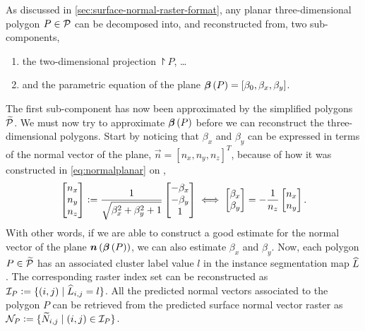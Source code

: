 As discussed in \cref{sec:surface-normal-raster-format}, any planar three-dimensional polygon $P \in \mathcal{P}$ can be decomposed into, and reconstructed from, two sub-components,
\begin{enumerate}[nosep]
  \item the two-dimensional projection $\project{P}$, \dots
  \item and the parametric equation of the plane $\boldsymbol{\beta}\left(P\right) = [\beta_0, \beta_x, \beta_y]$.
\end{enumerate}
The first sub-component has now been approximated by the simplified polygons $\widetilde{\mathcal{P}}$.
We must now try to approximate $\boldsymbol{\beta}\left(P\right)$ before we can reconstruct the three-dimensional polygons.
Start by noticing that $\beta_x$ and $\beta_y$ can be expressed in terms of the normal vector of the plane, $\vec{n} = {[n_x, n_y, n_z]}^T$, because of how it was constructed in \cref{eq:normalplanar} on ,
\begin{equation*}
  \begin{bmatrix}
    n_x\\
    n_y\\
    n_z
  \end{bmatrix}
  \vcentcolon=
  \frac{1}{\sqrt{\beta_x^2 + \beta_y^2 + 1}}
  \begin{bmatrix}
    -\beta_x\\
    -\beta_y\\
    1
  \end{bmatrix}
  \iff
  \begin{bmatrix}
    \beta_x\\
    \beta_y
  \end{bmatrix}
  =
  -\frac{1}{n_z}
  \begin{bmatrix}
    n_x\\
    n_y
  \end{bmatrix}.
\end{equation*}
With other words, if we are able to construct a good estimate for the normal vector of the plane $\boldsymbol{n}\left(\boldsymbol{\beta}\left(P\right)\right)$, we can also estimate $\beta_x$ and $\beta_y$.
Now, each polygon $P \in \widetilde{\mathcal{P}}$ has an associated cluster label value $l$ in the instance segmentation map $\widehat{L}$.
The corresponding raster index set can be reconstructed as $\mathcal{I}_P \vcentcolon= \{(i, j) \mid \widehat{L}_{i,j} = l \}$.
All the predicted normal vectors associated to the polygon $P$ can be retrieved from the predicted surface normal vector raster as $\mathcal{N}_{P} \vcentcolon= \{\widetilde{N}_{i,j} \mid (i,j) \in \mathcal{I}_P \}$.
